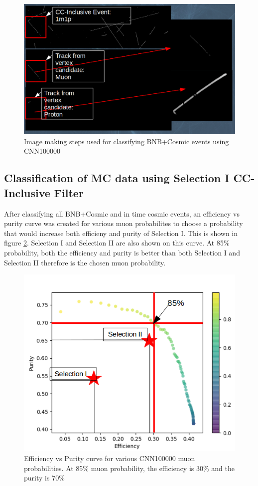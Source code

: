 \begin{figure}[htp!]
\centering
\includegraphics[width=\textwidth]{figs/cnn100000_image.png}
\caption{Image making steps used for classifying BNB+Cosmic events using CNN100000} 
\label{fig:cnn100000_image}
\end{figure}

\subsection{Classification of MC data using Selection I CC-Inclusive Filter}
After classifying all BNB+Cosmic and in time cosmic events, an efficiency vs purity curve was created for various muon probabilites to choose a probability that would increase both efficieny and purity of Selection I. This is shown in figure \ref{fig:roc}. Selection I and Selection II are also shown on this curve. At 85\% probability, both the efficiency and purity is better than both Selection I and Selection II therefore is the chosen muon probability. 

\begin{figure}[htp!]
\centering
\includegraphics[width=.5\textwidth]{figs/roc_cnn_selI&II.png}
\caption{Efficiency vs Purity curve for various CNN100000 muon probabilities. At 85\% muon probability, the efficiency is 30\% and the purity is 70\%} 
\label{fig:roc}
\end{figure}

